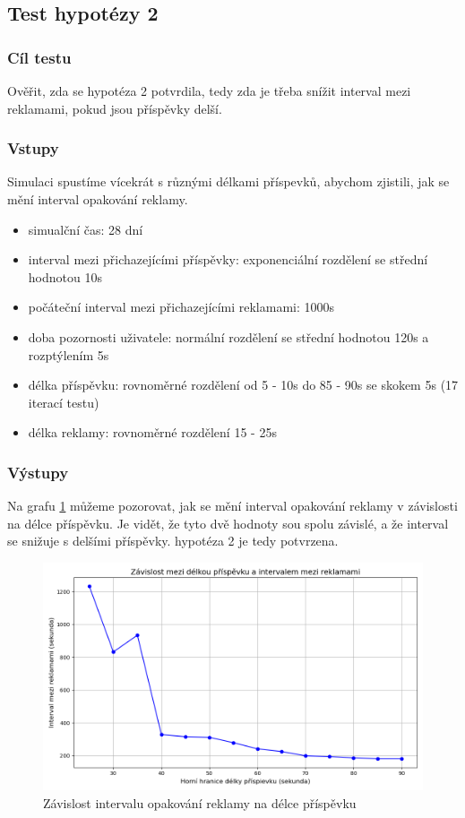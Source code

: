 \documentclass[11pt, a4paper]{article}
\begin{document}
\newpage

\subsection{Test hypotézy 2}

\subsubsection{Cíl testu}
Ověřit, zda se hypotéza 2 potvrdila, tedy zda je třeba snížit interval mezi reklamami, pokud jsou příspěvky delší.
\subsubsection{Vstupy}
Simulaci spustíme vícekrát s různými délkami příspevků, abychom zjistili, jak se mění interval opakování reklamy.
\begin{itemize}
    \item simualční čas: 28 dní
    \item interval mezi přichazejícími příspěvky: exponenciální rozdělení se střední hodnotou 10s
    \item počáteční interval mezi přichazejícími reklamami: 1000s
    \item doba pozornosti uživatele: normální rozdělení se střední hodnotou 120s a rozptýlením 5s
    \item délka příspěvku: rovnoměrné rozdělení od 5 - 10s do 85 - 90s se skokem 5s (17 iterací testu)
    \item délka reklamy: rovnoměrné rozdělení 15 - 25s
\end{itemize}

\subsubsection{Výstupy}

Na grafu \ref{fig:post_length_vs_ad_interval} můžeme pozorovat, jak se mění interval opakování reklamy v závislosti na délce příspěvku.
Je vidět, že tyto dvě hodnoty sou spolu závislé, a že interval se snižuje s delšími příspěvky.
hypotéza 2 je tedy potvrzena.
\begin{figure}[h]
    \centering
    \includegraphics[width=\linewidth]{post_length_vs_ad_interval.png}
    \caption{Závislost intervalu opakování reklamy na délce příspěvku}
    \label{fig:post_length_vs_ad_interval}
\end{figure}
\newpage
\end{document}
